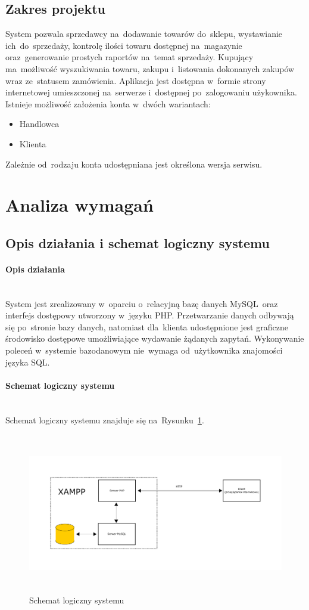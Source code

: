 \documentclass[a4paper, 12pt]{article}
\begin{document}
\subsection{Zakres projektu}
System pozwala sprzedawcy na~dodawanie towarów do~sklepu, wystawianie ich~do~sprzedaży, kontrolę ilości towaru dostępnej na~magazynie oraz~generowanie prostych raportów na~temat sprzedaży. Kupujący ma~możliwość wyszukiwania towaru, zakupu i~listowania dokonanych zakupów wraz ze~statusem zamówienia. Aplikacja jest dostępna w~formie strony internetowej umieszczonej na~serwerze i~dostępnej po~zalogowaniu użykownika. Istnieje możliwość założenia konta w~dwóch wariantach:
\begin{itemize}
	\item Handlowca
	\item Klienta
\end{itemize}
Zależnie od~rodzaju konta udostępniana jest określona wersja serwisu.
\section{Analiza wymagań}
\subsection{Opis działania i schemat logiczny systemu}
\paragraph{Opis działania} \mbox{}\\
System jest zrealizowany w~oparciu o~relacyjną bazę danych MySQL~oraz interfejs dostępowy utworzony w~języku PHP. Przetwarzanie danych odbywają się po~stronie bazy danych, natomiast dla~klienta udostępnione jest graficzne środowisko dostępowe umożliwiające wydawanie żądanych zapytań. Wykonywanie poleceń w~systemie bazodanowym nie~wymaga od~użytkownika znajomości języka SQL.

\paragraph{Schemat logiczny systemu} \mbox{}\\
Schemat logiczny systemu znajduje się na~Rysunku~\ref{fig:schematLogiczny}.

\begin{figure}[H]
	\includegraphics[height=7cm]{schemat.png}
	\caption[Schemat logiczny systemu]{Schemat logiczny systemu}
	\label{fig:schematLogiczny}
\end{figure}
\end{document}
